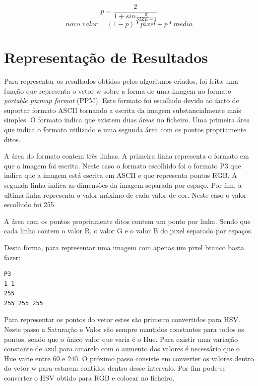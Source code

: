 \documentclass[a4paper]{report}
\begin{document}
\[ p = \frac{2}{1 + sin{\frac{\pi}{SIZE - 1}}} \]
\[novo\_valor = (1-p) * pixel + p * media \]


\chapter{Representação de Resultados}

Para representar os resultados obtidos pelos algoritmos criados, foi feita uma
função que representa o vetor w sobre a forma de uma imagem no formato
\textit{portable pixmap format} (PPM). Este formato foi escolhido devido ao
facto de suportar formato ASCII tornando a escrita da imagem substancialmente
mais simples. O formato indica que existem duas áreas no ficheiro. Uma primeira
área que indica o formato utilizado e uma segunda área com os pontos
propriamente ditos.

A área do formato contem três linhas. A primeira linha representa o formato em
que a imagem foi escrita. Neste caso o formato escolhido foi o formato P3 que
indica que a imagem está escrita em ASCII e que representa pontos RGB. A segunda
linha indica as dimensões da imagem separada por espaço. Por fim, a ultima linha
representa o valor máximo de cada valor de cor. Neste caso o valor escolhido
foi 255.

A área com os pontos propriamente ditos contem um ponto por linha. Sendo que
cada linha contem o valor R, o valor G e o valor B do pixel separado por espaços.

Desta forma, para representar uma imagem com apenas um pixel branco basta fazer:
\begin{verbatim}
P3
1 1
255
255 255 255
\end{verbatim}

Para representar os pontos do vetor estes são primeiro convertidos para HSV.
Neste passo a Saturação e Valor são sempre mantidos constantes para todos os
pontos, sendo que o único valor que varia é o Hue. Para existir uma variação
constante de azul para amarelo com o aumento dos valores é necessário que o Hue
varie entre 60 e 240. O próximo passo consiste em converter os valores dentro do
vetor w para estarem contidos dentro desse intervalo. Por fim pode-se converter
o HSV obtido para RGB e colocar no ficheiro.
\end{document}
